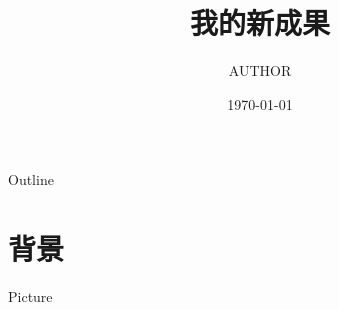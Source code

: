 \documentclass[CJKchecksingle]{beamer}
\title
{我的新成果}
\author[short] %
{AUTHOR}
\institute[short] %
{
Department of FOO\\
BAR University
}
\date %
{\today}
\begin{document}
\begin{frame}
\titlepage
\end{frame}

\begin{frame}{Outline}
\tableofcontents
\end{frame}




\section{背景}

\begin{frame}{Picture}
\end{frame}

%
%
\end{document}
